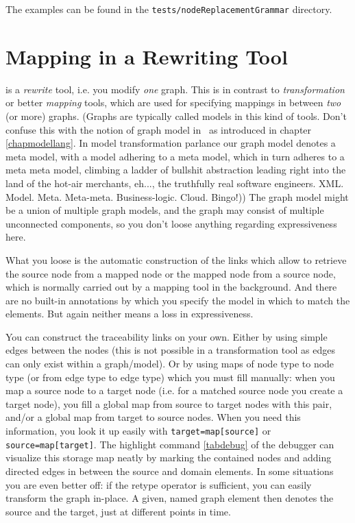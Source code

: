 The examples can be found in the \texttt{tests/nodeReplacementGrammar} directory.


\section{Mapping in a Rewriting Tool}\label{sec:transfo}
\GrG{} is a \emph{rewrite} tool, i.e. you modify \emph{one} graph.
This is in contrast to \emph{transformation} or better \emph{mapping} tools, which are used for specifying mappings in between \emph{two} (or more) graphs. (Graphs are typically called models in this kind of tools. Don't confuse this with the notion of graph model in \GrG\ as introduced in chapter \ref{chapmodellang}. In model transformation parlance our graph model denotes a meta model, with a model adhering to a meta model, which in turn adheres to a meta meta model, climbing a ladder of bullshit abstraction leading right into the land of the hot-air merchants, eh..., the truthfully real software engineers. XML. Model. Meta. Meta-meta. Business-logic. Cloud. Bingo!))
The graph model might be a union of multiple graph models, and the graph may consist of multiple unconnected components, so you don't loose anything regarding expressiveness here.

What you loose is the automatic construction of the  links which allow to retrieve the source node from a mapped node or the mapped node from a source node, which is normally carried out by a mapping tool in the background.
And there are no built-in annotations by which you specify the model in which to match the elements.
But again neither means a loss in expressiveness.

You can construct the traceability links on your own.
Either by using simple edges between the nodes (this is not possible in a transformation tool as edges can only exist within a graph/model).
Or by using maps of node type to node type (or from edge type to edge type) which you must fill manually:
when you map a source node to a target node (i.e. for a matched source node you create a target node), you fill a global map from source to target nodes with this pair, and/or a global map from target to source nodes.
When you need this information, you look it up easily with \texttt{target=map[source]} or \texttt{source=map[target]}.
The highlight command \ref{tabdebug} of the debugger can visualize this storage map neatly by marking the contained nodes and adding directed edges in between the source and domain elements.
In some situations you are even better off: if the retype operator is sufficient, you can easily transform the graph in-place. A given, named graph element then denotes the source and the target, just at different points in time.

